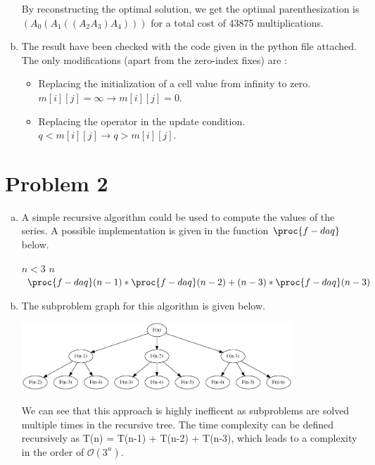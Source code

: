 \documentclass[a4paper, 10pt, twoside]{article}
\begin{document}
\begin{enumerate}[a)]
	      By reconstructing the optimal solution, we get the optimal parenthesization is $(A_0(A_1((A_2A_3)A_4)))$ for a total cost of 43875 multiplications.

	\item The result have been checked with the code given in the python file attached. The only modifications (apart from the zero-index fixes) are :

	      \begin{itemize}
		      \item Replacing the initialization of a cell value from infinity to zero. $m[i][j] = \infty \rightarrow m[i][j] = 0$.
		      \item Replacing the operator in the update condition. $q < m[i][j] \rightarrow q > m[i][j]$.
	      \end{itemize}

\end{enumerate}

\section*{Problem 2}
\begin{enumerate}[a)]
	\item A simple recursive algorithm could be used to compute the values of the series. A possible implementation is given in the function $\proc{f-daq}$ below.
	
	\begin{codebox}
		\zi \If $n < 3$
		\zi \Then \Return $n$ \End
		\zi \Return $\proc{f-daq}(n-1) * \proc{f-daq}(n-2) + (n-3)*\proc{f-daq}(n-3)$ \End
	\end{codebox}

	\item The subproblem graph for this algorithm is given below.
	
	\begin{center}
		\includegraphics[width=0.8\textwidth]{fib_daq.png}
	\end{center}

	We can see that this approach is highly inefficent as subproblems are solved multiple times in the recursive tree. The time complexity can be defined recursively as T(n) = T(n-1) + T(n-2) + T(n-3), which leads to a complexity in the order of $\mathcal{O}(3^n)$.
	
\end{enumerate}
\end{document}
